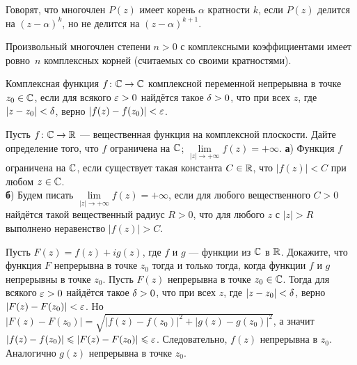 \documentclass[a4paper, 12pt]{article}
\begin{document}

Говорят, что многочлен $P(z)$ имеет корень $\alpha$ кратности $k$, если $P(z)$ делится на $(z-\alpha)^k$, но не делится на $(z-\alpha)^{k+1}$.


{\narrower
{}
Произвольный многочлен степени $n>0$ с комплексными коэффициентами имеет
ровно~$n$ комплексных корней (считаемых со своими кратностями).

}

Комплексная функция $f\colon\mathbb{C}\rightarrow\mathbb{C}$ комплексной переменной  непрерывна в точке $z_0\in\mathbb{C}$,
если для всякого $\varepsilon>0$ найдётся такое $\delta>0$, что при всех $z$, где $|z-z_0|<\delta$, верно $|f(z)-f(z_0)|<\varepsilon$.












Пусть $f\colon \mathbb{C} \rightarrow \mathbb{R}$ — вещественная функция на комплексной плоскости.
Дайте определение того, что
 $f$ ограничена на $\mathbb{C}$;
 $\lim\limits_{|z|\to+\infty}f(z) = +\infty$.
\textbf{а})
Функция $f$ ограничена на $\mathbb{C}$, если существует такая константа $C\in\mathbb{R}$, что $|f(z)|<C$ при любом $z\in\mathbb{C}$.
\\\textbf{б})
Будем писать $\lim\limits_{|z|\to+\infty}f(z) = +\infty$, если для любого вещественного $C>0$ найдётся такой вещественный радиус $R>0$, что для любого $z$ с $|z|>R$ выполнено неравенство $|f(z)|>C$.














Пусть $F(z) = f(z) + i g(z)$, где $f$ и $g$ — функции из $\mathbb{C}$ в $\mathbb{R}$.
Докажите, что функция $F$ непрерывна в точке $z_0$ тогда и только тогда, когда функции $f$ и $g$ непрерывны в точке $z_0$.
Пусть $F(z)$ непрерывна в точке $z_0\in\mathbb{C}$.
Тогда для всякого $\varepsilon>0$ найдётся такое $\delta>0$, что при всех $z$, где $|z-z_0|<\delta$, верно $|F(z)-F(z_0)|<\varepsilon$.
Но $|F(z)-F(z_0)| = \sqrt{|f(z)-f(z_0)|^2+|g(z)-g(z_0)|^2}$, а значит $|f(z)-f(z_0)|\leqslant|F(z)-F(z_0)|\leqslant\varepsilon$.
Следовательно, $f(z)$ непрерывна в $z_0$. Аналогично  $g(z)$ непрерывна в точке $z_0$.
\end{document}
